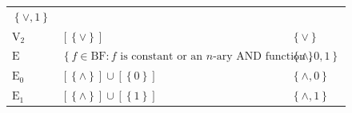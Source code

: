 \documentclass[10pt,a4paper]{article}
\newcommand{\set}[1]{\left\{#1\right\}}
\newcommand{\clonefont}[1]{\mathrm{#1}}
\begin{document}
\begin{figure}[hbtp]
\begin{small}
\begin{longtable}[]{p{}p{}p{}}
\begin{minipage}[t]{0.38\columnwidth}
                \(\set{\lor,1}\)\strut
            \end{minipage}\tabularnewline
            \begin{minipage}[t]{0.12\columnwidth}\raggedright
                \(\clonefont{V_2}\)\strut
            \end{minipage} & \begin{minipage}[t]{0.41\columnwidth}\raggedright
                \([\set{\lor}]\)\strut
            \end{minipage} & \begin{minipage}[t]{0.38\columnwidth}\raggedright
                \(\set{\lor}\)\strut
            \end{minipage}\tabularnewline
            \begin{minipage}[t]{0.12\columnwidth}\raggedright
                \(\clonefont{E}\)\strut
            \end{minipage} & \begin{minipage}[t]{0.41\columnwidth}\raggedright
                \(\set{f \in \clonefont{BF} : f \text{ is constant or an $n$-ary AND function}}\)\strut
            \end{minipage} & \begin{minipage}[t]{0.38\columnwidth}\raggedright
                \(\set{\land,0,1}\)\strut
            \end{minipage}\tabularnewline
            \begin{minipage}[t]{0.12\columnwidth}\raggedright
                \(\clonefont{E_0}\)\strut
            \end{minipage} & \begin{minipage}[t]{0.41\columnwidth}\raggedright
                \([\set{\land}] \cup [\set{0}]\)\strut
            \end{minipage} & \begin{minipage}[t]{0.38\columnwidth}\raggedright
                \(\set{\land,0}\)\strut
            \end{minipage}\tabularnewline
            \begin{minipage}[t]{0.12\columnwidth}\raggedright
                \(\clonefont{E_1}\)\strut
            \end{minipage} & \begin{minipage}[t]{0.41\columnwidth}\raggedright
                \([\set{\land}] \cup [\set{1}]\)\strut
            \end{minipage} & \begin{minipage}[t]{0.38\columnwidth}\raggedright
                \(\set{\land,1}\)\strut

\end{minipage}
\end{longtable}
\end{small}
\end{figure}
\end{document}
